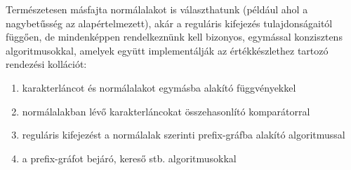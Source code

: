 \documentclass[
    parspace,
    noindent,
    nohyp,
]{elteiktdk}[2023/04/10]
\begin{document}
Természetesen másfajta normálalakot is választhatunk (például ahol a nagybetűsség az alapértelmezett),
akár a reguláris kifejezés tulajdonságaitól függően,
de mindenképpen rendelkeznünk kell bizonyos, egymással konzisztens algoritmusokkal,
amelyek együtt implementálják az értékkészlethez tartozó rendezési kollációt:

\begin{enumerate}
    \item karakterláncot és normálalakot egymásba alakító függvényekkel
    \item normálalakban lévő karakterláncokat összehasonlító komparátorral
    \item reguláris kifejezést a normálalak szerinti prefix-gráfba alakító algoritmussal
    \item a prefix-gráfot bejáró, kereső stb. algoritmusokkal
\end{enumerate}





\pagebreak

\appendix

{}
\printbibliography[title=\biblabel]
\cleardoublepage
\end{document}
